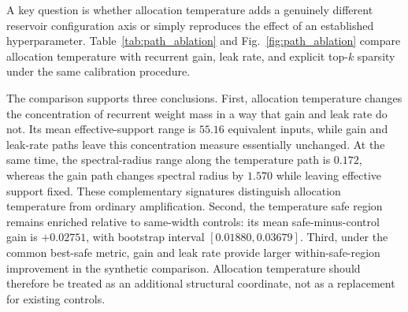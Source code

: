 \documentclass[11pt,a4paper]{article}
\begin{document}
A key question is whether allocation temperature adds a genuinely different reservoir configuration axis or simply reproduces the effect of an established hyperparameter. Table~\ref{tab:path_ablation} and Fig.~\ref{fig:path_ablation} compare allocation temperature with recurrent gain, leak rate, and explicit top-$k$ sparsity under the same calibration procedure.

\begin{table}[t]
\centering
\caption{Comparison of four one-dimensional reservoir controls. Allocation temperature changes the continuous concentration of recurrent weight mass while the bulk scale is normalized. Gain changes recurrent scale, leak rate changes the update timescale, and top-$k$ sparsity changes the hard connectivity pattern.}
\label{tab:path_ablation}
\end{table}

The comparison supports three conclusions. First, allocation temperature changes the concentration of recurrent weight mass in a way that gain and leak rate do not. Its mean effective-support range is $55.16$ equivalent inputs, while gain and leak-rate paths leave this concentration measure essentially unchanged. At the same time, the spectral-radius range along the temperature path is $0.172$, whereas the gain path changes spectral radius by $1.570$ while leaving effective support fixed. These complementary signatures distinguish allocation temperature from ordinary amplification. Second, the temperature safe region remains enriched relative to same-width controls: its mean safe-minus-control gain is $+0.02751$, with bootstrap interval $[0.01880,0.03679]$. Third, under the common best-safe metric, gain and leak rate provide larger within-safe-region improvement in the synthetic comparison. Allocation temperature should therefore be treated as an additional structural coordinate, not as a replacement for existing controls.
\end{document}
